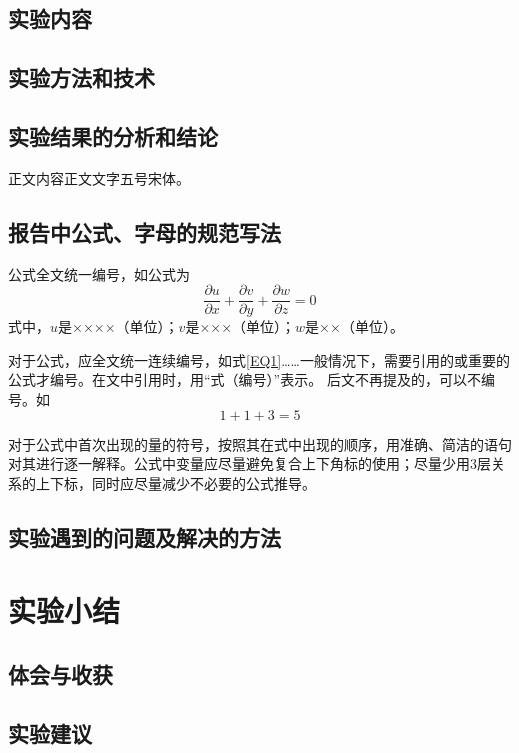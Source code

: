 \documentclass{iceli}
\begin{document}
\subsection{实验内容}

\subsection{实验方法和技术}

\subsection{实验结果的分析和结论}
正文内容正文文字五号宋体。
\subsection{报告中公式、字母的规范写法}
公式全文统一编号，如公式为
\begin{equation}\label{EQ1}
\frac{\partial u}{\partial x}+\frac{\partial v}{\partial y}+\frac{\partial w}{\partial z}=0
\end{equation}
式中，$u$是××××（单位）；$v$是×××（单位）；$w$是××（单位）。

对于公式，应全文统一连续编号，如式\eqref{EQ1}……一般情况下，需要引用的或重要的公式才编号。在文中引用时，用“式（编号）”表示。
后文不再提及的，可以不编号。如
\begin{equation*}
1 + 1 + 3 = 5
\end{equation*}

对于公式中首次出现的量的符号，按照其在式中出现的顺序，用准确、简洁的语句对其进行逐一解释。公式中变量应尽量避免复合上下角标的使用；尽量少用3层关系的上下标，同时应尽量减少不必要的公式推导。

\subsection{实验遇到的问题及解决的方法}

\section{实验小结}
\subsection{体会与收获}

\subsection{实验建议}


\renewcommand\refname{\heiti\wuhao\centerline{参考文献}\global\def\refname{参考文献}}
\vskip 12pt

\let\OLDthebibliography\thebibliography
\renewcommand\thebibliography[1]{
  \OLDthebibliography{#1}
  \setlength{\parskip}{0pt}
  \setlength{\itemsep}{0pt plus 0.3ex}
}

{
\renewcommand{\baselinestretch}{0.9}
\liuhao


}
\end{document}
